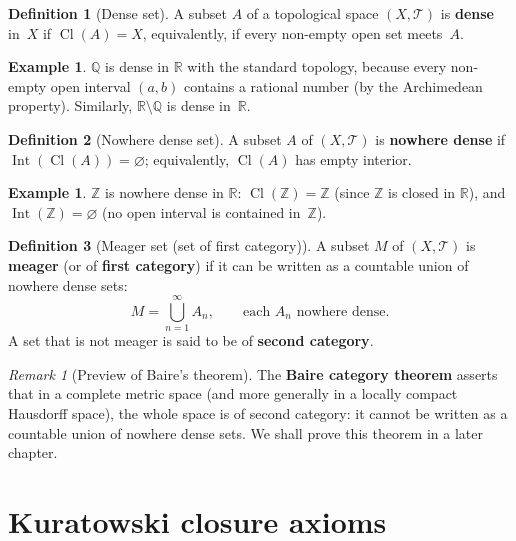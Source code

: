 \documentclass[11pt,a4paper,twoside]{book}
\theoremstyle{remark}
\newtheorem{remark}[theorem]{Remark}
\theoremstyle{definition}
\newtheorem{exampleplain}[theorem]{Example}
\theoremstyle{definition}
\newtheorem{definition}{Definition}[section]
\newcommand{\Tau}{\mathcal{T}}           %
\newcommand{\R}{\mathbb{R}}
\newcommand{\Z}{\mathbb{Z}}
\newcommand{\Q}{\mathbb{Q}}
\DeclareMathOperator{\Int}{Int}
\DeclareMathOperator{\Cl}{Cl}
\begin{document}
\begin{definition}[Dense set]\label{def:dense}
A subset $A$ of a topological space $(X,\Tau)$ is \textbf{dense} in~$X$ if
$\Cl(A)=X$, equivalently, if every non-empty open set meets~$A$.
\end{definition}

\begin{exampleplain}\label{ex:Q-dense}
$\Q$ is dense in $\R$ with the standard topology, because every non-empty open
interval $(a,b)$ contains a rational number (by the Archimedean property).
Similarly, $\R\setminus\Q$ is dense in~$\R$.
\end{exampleplain}

\begin{definition}[Nowhere dense set]\label{def:nowhere-dense}
A subset $A$ of $(X,\Tau)$ is \textbf{nowhere dense} if $\Int(\Cl(A))=\varnothing$;
equivalently, $\Cl(A)$ has empty interior.
\end{definition}

\begin{exampleplain}\label{ex:Z-nowhere-dense}
$\Z$ is nowhere dense in $\R$: $\Cl(\Z)=\Z$ (since $\Z$ is closed in $\R$),
and $\Int(\Z)=\varnothing$ (no open interval is contained in~$\Z$).
\end{exampleplain}

\begin{definition}[Meager set (set of first category)]\label{def:meager}
A subset $M$ of $(X,\Tau)$ is \textbf{meager} (or of \textbf{first category})
if it can be written as a countable union of nowhere dense sets:
\[
  M = \bigcup_{n=1}^{\infty} A_n, \qquad
  \text{each $A_n$ nowhere dense.}
\]
A set that is not meager is said to be of \textbf{second category}.
\end{definition}

\begin{remark}[Preview of Baire's theorem]
The \textbf{Baire category theorem} asserts that
in a complete metric space (and more generally in a locally compact Hausdorff
space), the whole space is of second category: it cannot be written as a
countable union of nowhere dense sets.  We shall prove this theorem in a later
chapter.
\end{remark}


\section{Kuratowski closure axioms}
\label{sec:kuratowski-closure}
\end{document}
